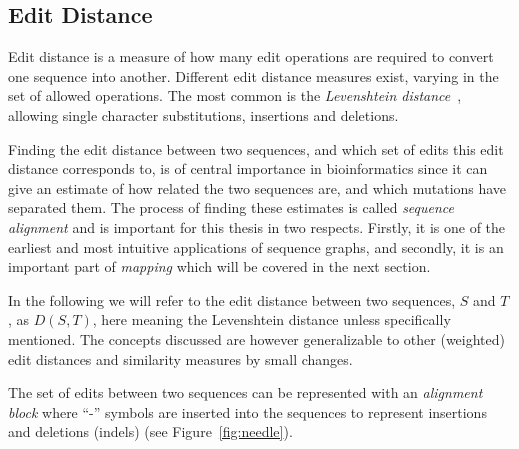 \subsection{Edit Distance}
Edit distance is a measure of how many edit operations are required to convert one sequence into another.
Different edit distance measures exist, varying in the set of allowed operations.
The most common is the \emph{Levenshtein distance}~\cite{levenshtein}, allowing single character substitutions, insertions and deletions. 

Finding the edit distance between two sequences, and which set of edits this edit distance corresponds to, is of central importance in bioinformatics since it can give an estimate of how related the two sequences are, and which mutations have separated them.
The process of finding these estimates is called \emph{sequence alignment} and is important for this thesis in two respects.
Firstly, it is one of the earliest and most intuitive applications of sequence graphs, and secondly, it is an important part of \emph{mapping} which will be covered in the next section. 

In the following we will refer to the edit distance between two sequences, $S$ and $T$, as $D(S, T)$, here meaning the Levenshtein distance unless specifically mentioned.
The concepts discussed are however generalizable to other (weighted) edit distances and similarity measures by small changes.

The set of edits between two sequences can be represented with an \emph{alignment block} where ``-'' symbols are inserted into the sequences to represent insertions and deletions (indels) (see Figure~\ref{fig:needle}).

